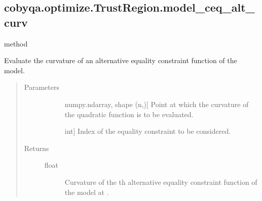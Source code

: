 \documentclass[letterpaper,10pt,english]{sphinxmanual}
\begin{document}
\begin{fulllineitems}
\begin{fulllineitems}
\end{fulllineitems}



\subsection{cobyqa.optimize.TrustRegion.model\_ceq\_alt\_curv}
\label{\detokenize{refs/generated/cobyqa.optimize.TrustRegion.model_ceq_alt_curv:cobyqa-optimize-trustregion-model-ceq-alt-curv}}\label{\detokenize{refs/generated/cobyqa.optimize.TrustRegion.model_ceq_alt_curv::doc}}
\sphinxAtStartPar
method

\begin{fulllineitems}
\label{\detokenize{refs/generated/cobyqa.optimize.TrustRegion.model_ceq_alt_curv:cobyqa.optimize.TrustRegion.model_ceq_alt_curv}}
\sphinxAtStartPar
Evaluate the curvature of an alternative equality constraint function of
the model.
\begin{quote}\begin{description}
\item[{Parameters}] \leavevmode\begin{description}
\item[{}] \leavevmode{[}numpy.ndarray, shape (n,){]}
\sphinxAtStartPar
Point at which the curvature of the quadratic function is to be
evaluated.

\item[{}] \leavevmode{[}int{]}
\sphinxAtStartPar
Index of the equality constraint to be considered.

\end{description}

\item[{Returns}] \leavevmode\begin{description}
\item[{float}] \leavevmode
\sphinxAtStartPar
Curvature of the \sphinxhyphen{}th alternative equality constraint function of
the model at .

\end{description}

\end{description}\end{quote}


\end{fulllineitems}
\end{fulllineitems}
\end{document}
